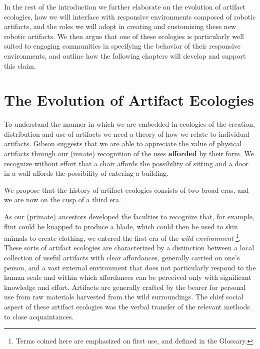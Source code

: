 In the rest of the introduction we further elaborate on the evolution of artifact ecologies, how we will interface with responsive environments composed of robotic artifacts, and the roles we will adopt in creating and customizing these new robotic artifacts.
We then argue that one of these ecologies is particularly well suited to engaging communities in specifying the behavior of their responsive environments, and outline how the following chapters will develop and support this claim.

\section{The Evolution of Artifact Ecologies}
%
To understand the manner in which we are embedded in ecologies of the creation, distribution and use of artifacts we need a theory of how we relate to individual artifacts.
Gibson \citeyearpar{gibson_1979} suggests that we are able to appreciate the value of physical artifacts through our (innate) recognition of the uses \textbf{afforded} by their form.
We recognize without effort that a chair affords the possibility of sitting and a door in a wall affords the possibility of entering a building. 

We propose that the history of artifact ecologies consists of two broad eras, and we are now on the cusp of a third era.

As our (primate) ancestors developed the faculties to recognize that, for example, flint could be knapped to produce a blade, which could then be used to skin animals to create clothing, we entered the first era of the \emph{wild environment}%
\footnote{Terms coined here are emphasized on first use, and defined in the Glossary.}. 
These sorts of artifact ecologies are characterized by a distinction between a local collection of useful artifacts with clear affordances, generally carried on one's person, and a vast external environment that does not particularly respond to the human scale and within which affordances can be perceived only with significant knowledge and effort.
Artifacts are generally crafted by the bearer for personal use from raw materials harvested from the wild surroundings. 
The chief social aspect of these artifact ecologies was the verbal transfer of the relevant methods to close acquaintances.

